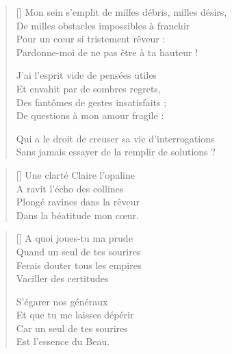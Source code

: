 \settowidth{\versewidth}{Qui a le droit de creuser sa vie d'interrogations}
\begin{verse}[\versewidth]
Mon sein s'emplit de milles débris, milles désirs, \\
De milles obstacles impossibles à franchir \\
Pour un cœur si tristement rêveur : \\
Pardonne-moi de ne pas être à ta hauteur !

J'ai l'esprit vide de pensées utiles \\
Et envahit par de sombres regrets, \\
Des fantômes de gestes insatisfaits ; \\
De questions à mon amour fragile :

Qui a le droit de creuser sa vie d'interrogations \\
Sans jamais essayer de la remplir de solutions ?
\end{verse}


\settowidth{\versewidth}{Plongé ravines dans la rêveur}
\begin{verse}[\versewidth]
Une clarté Claire l'opaline \\
A ravit l'écho des collines \\
Plongé ravines dans la rêveur \\
Dans la béatitude mon cœur.
\end{verse}

\newpage

\settowidth{\versewidth}{Ferais douter tous les empires}
\begin{verse}[\versewidth]
A quoi joues-tu ma prude \\
Quand un seul de tes sourires \\
Ferais douter tous les empires \\
Vaciller des certitudes

S'égarer nos généraux \\
Et que tu me laisses dépérir \\
Car un seul de tes sourires \\
Est l'essence du Beau.
\end{verse}